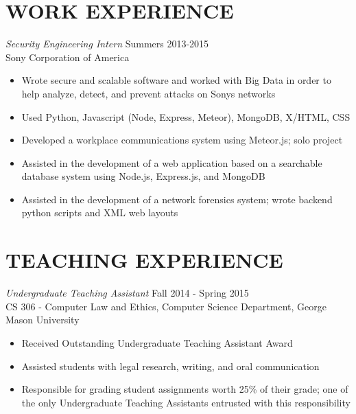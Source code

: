 \documentclass[margin, 10pt]{res} %
\begin{document}
\begin{resume}
\section{WORK EXPERIENCE}

{\sl Security Engineering Intern} \hfill Summers 2013-2015 \\
Sony Corporation of America 

\begin{itemize} \itemsep -2pt %
\item Wrote secure and scalable software and worked with Big Data in order to help analyze, detect, and prevent attacks on Sony\textsc{}s networks
\item Used Python, Javascript (Node, Express, Meteor), MongoDB, X/HTML, CSS 
\item Developed a workplace communications system using Meteor.js; solo project
\item Assisted in the development of a web application based on a searchable database system using Node.js, Express.js, and MongoDB
\item Assisted in the development of a network forensics system; wrote backend python scripts and XML web layouts
\end{itemize} 
 
 
\section{TEACHING EXPERIENCE}

{\sl Undergraduate Teaching Assistant} \hfill Fall 2014 - Spring 2015 \\
CS 306 - Computer Law and Ethics, Computer Science Department, George Mason University
\begin{itemize} \itemsep -2pt %
\item Received Outstanding Undergraduate Teaching Assistant Award 
\item Assisted students with legal research, writing, and oral communication
\item Responsible for grading student assignments worth 25\% of their grade; one of the only Undergraduate Teaching Assistants entrusted with this responsibility
\end{itemize} 


\end{resume}
\end{document}

